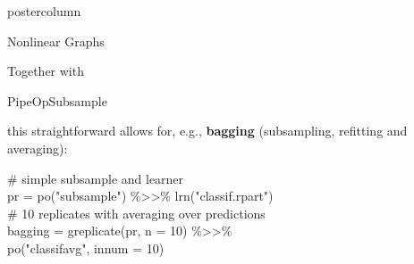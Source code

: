 \documentclass{beamer}
\newcommand{\codeinline}[1]{\begin{codeboxinline}#1\end{codeboxinline}}
\begin{document}
\begin{frame}[fragile]{}
\begin{columns}
\begin{column}{.245\textwidth}
\begin{beamercolorbox}[center]{postercolumn}
\begin{minipage}{.98\textwidth}
{\begin{myblock}{Nonlinear Graphs}
\begin{center}
              \end{center}
              Together with \codeinline{PipeOpSubsample} this straightforward allows for, e.g., \textbf{bagging} (subsampling, refitting and averaging):
              \begin{codeboxexample}
						    {\footnotesize
                  \# simple subsample and learner\\
                  pr = po("subsample") \%>{}>\% lrn("classif.rpart")\\
                  \# 10 replicates with averaging over predictions\\
                  bagging = greplicate(pr, n = 10) \%>{}>\%\\
                  \hspace*{1ex} po("classifavg", innum = 10)}
					    \end{codeboxexample}
            \end{myblock}
            \vfill}
         \end{minipage}
	    \end{beamercolorbox}
		\end{column}
 \end{columns}
\end{frame}
\end{document}
